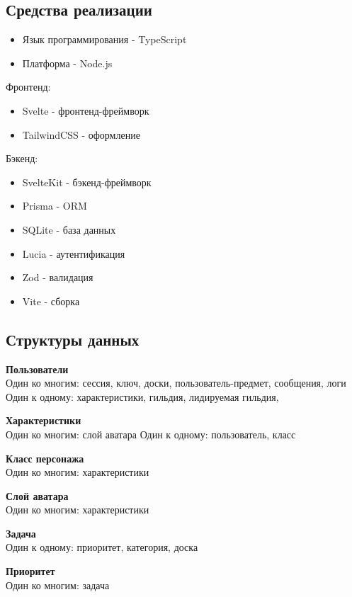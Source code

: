 \documentclass[../document.tex]{subfiles}
\begin{document}
\subsection{Средства реализации}
\begin{itemize}
  \item Язык программирования - TypeScript
  \item Платформа - Node.js
\end{itemize}
\par Фронтенд:
\begin{itemize}
  \item Svelte - фронтенд-фреймворк
  \item TailwindCSS - оформление
\end{itemize}
\par Бэкенд:
\begin{itemize}
  \item SvelteKit - бэкенд-фреймворк
  \item Prisma - ORM
  \item SQLite - база данных
  \item Lucia - аутентификация
  \item Zod - валидация
  \item Vite - сборка
\end{itemize}
\subsection{Структуры данных}
\par \textbf{Пользователи}\\
Один ко многим: сессия, ключ, доски, пользователь-предмет, сообщения, логи
Один к одному: характеристики, гильдия, лидируемая гильдия,

\par \textbf{Характеристики}\\
Один ко многим: слой аватара
Один к одному: пользователь, класс

\par \textbf{Класс персонажа}\\
Один ко многим: характеристики

\par \textbf{Слой аватара}\\
Один ко многим: характеристики

\par \textbf{Задача}\\
Один к одному: приоритет, категория, доска

\par \textbf{Приоритет}\\
Один ко многим: задача
\end{document}
